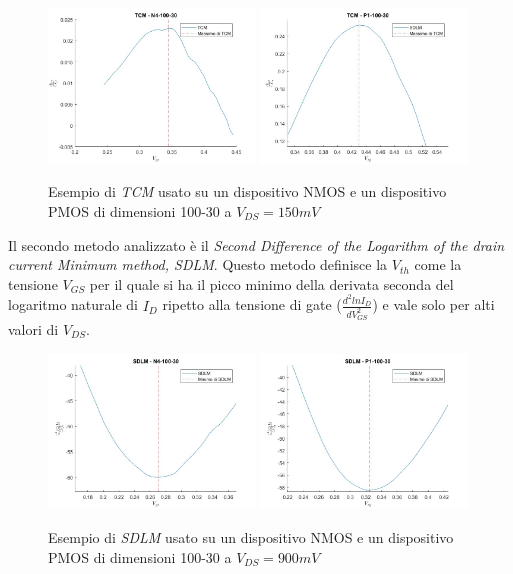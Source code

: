 \documentclass[12pt, letterpaper]{book}
\begin{document}
\begin{figure}[h!]
\centering
 \includegraphics[width=0.49\textwidth]{TCM-N4-100-30-NoFit}
 \includegraphics[width=0.49\textwidth]{TCM-P1-100-30-NoFit}
 \caption{Esempio di \emph{TCM} usato su un dispositivo NMOS e un dispositivo PMOS di dimensioni 100-30 a $V_{DS} = 150 mV$}
\end{figure}

Il secondo metodo analizzato è il \emph{Second Difference of the Logarithm of the drain current Minimum method, SDLM}. Questo metodo definisce la $V_{th}$ come la tensione $V_{GS}$ per il quale si ha il picco minimo della derivata seconda del logaritmo naturale di $I_D$ ripetto alla tensione di gate ($\frac{d^2lnI_D}{dV_{GS}^2}$) e vale solo per alti valori di $V_{DS}$. \\

\begin{figure}[h!]
\centering
 \includegraphics[width=0.49\textwidth]{SDLM-N4-100-30-NoFit}
 \includegraphics[width=0.49\textwidth]{SDLM-P1-100-30-NoFit}
 \caption{Esempio di \emph{SDLM} usato su un dispositivo NMOS e un dispositivo PMOS di dimensioni 100-30 a $V_{DS} = 900 mV$}
\end{figure}
\end{document}
